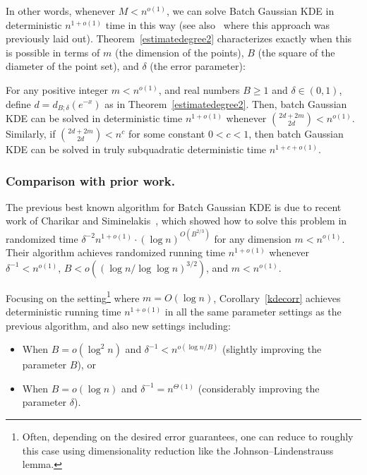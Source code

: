 In other words, whenever $M < n^{o(1)}$, we can solve Batch Gaussian KDE in deterministic $n^{1+o(1)}$ time in this way (see also~\cite[Section~5.3]{alman2020algorithms} where this approach was previously laid out). Theorem~\ref{estimatedegree2} characterizes exactly when this is possible in terms of $m$ (the dimension of the points), $B$ (the square of the diameter of the point set), and $\delta$ (the error parameter):

\begin{corollary} \label{kdecorr}
For any positive integer $m  < n^{o(1)}$, and real numbers $B \geq 1$ and $\delta \in (0,1)$, define $d = d_{B; \delta} (e^{-x})$ as in Theorem~\ref{estimatedegree2}. 
Then, batch Gaussian KDE can be solved in deterministic time $n^{1+o(1)}$ whenever $\binom{2d+2m}{2d} < n^{o(1)}$.
Similarly, if $\binom{2d+2m}{2d} < n^{c}$ for some constant $0 < c < 1$, then batch Gaussian KDE can be solved in truly subquadratic deterministic time $n^{1 + c + o(1)}$.
\end{corollary}

\subsubsection{Comparison with prior work.}\label{subsec:1} The previous best known algorithm for Batch Gaussian KDE is due to recent work of Charikar and Siminelakis~\cite{charikar2017hashing}, which showed how to solve this problem in randomized time $\delta^{-2} n^{1+o(1)} \cdot (\log n)^{O(B^{2/3})}$ for any dimension $m < n^{o(1)}$. Their algorithm achieves randomized running time $n^{1+o(1)}$ whenever $\delta^{-1} < n^{o(1)}$, $B < o((\log n / \log\log n)^{3/2})$, and $m < n^{o(1)}$. 

Focusing on the setting\footnote{Often, depending on the desired error guarantees, one can reduce to roughly this case using dimensionality reduction like the Johnson–Lindenstrauss lemma.} where $m = O(\log n)$, Corollary~\ref{kdecorr} achieves deterministic running time $n^{1+o(1)}$ in all the same parameter settings as the previous algorithm, and also new settings including:
\begin{itemize}
    \item When $B = o(\log^2 n)$ and $\delta^{-1} < n^{o(\log n / B)}$ (slightly improving the parameter $B$), or
    \item When $B = o(\log n)$ and $\delta^{-1} = n^{\Theta(1)}$ (considerably improving the parameter $\delta$).
\end{itemize}

